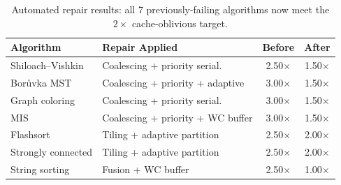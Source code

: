 \documentclass[11pt]{article}
\begin{document}
\begin{table}[h]
\centering
\caption{Automated repair results: all 7 previously-failing algorithms
  now meet the $2\times$ cache-oblivious target.}
\label{tab:repair}
\begin{tabular}{@{}llcc@{}}
\toprule
\textbf{Algorithm} & \textbf{Repair Applied} & \textbf{Before} & \textbf{After} \\
\midrule
Shiloach--Vishkin & Coalescing + priority serial. & 2.50$\times$ & 1.50$\times$ \\
Bor\r{u}vka MST & Coalescing + priority + adaptive & 3.00$\times$ & 1.50$\times$ \\
Graph coloring & Coalescing + priority serial. & 3.00$\times$ & 1.50$\times$ \\
MIS & Coalescing + priority + WC buffer & 3.00$\times$ & 1.50$\times$ \\
Flashsort & Tiling + adaptive partition & 2.50$\times$ & 2.00$\times$ \\
Strongly connected & Tiling + adaptive partition & 2.50$\times$ & 2.00$\times$ \\
String sorting & Fusion + WC buffer & 2.50$\times$ & 1.00$\times$ \\
\bottomrule
\end{tabular}
\end{table}
\end{document}
